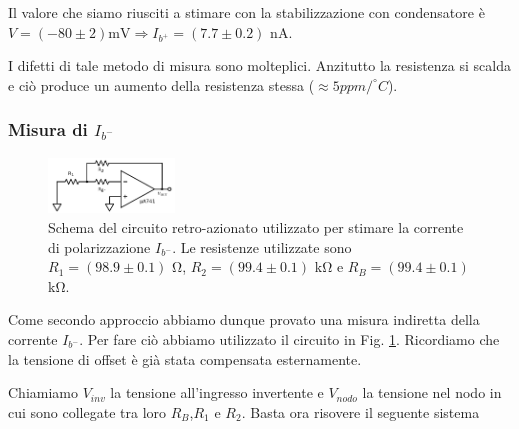 Il valore che siamo riusciti a stimare con la stabilizzazione con condensatore è $V=(-80 \pm 2) \si{\milli\volt} \Rightarrow I_{b^+}=(7.7 \pm 0.2)$ \si{\nano\ampere}.



I difetti di tale metodo di misura sono molteplici. Anzitutto la resistenza si scalda e ciò produce un aumento della resistenza stessa ($\approx 5 ppm/^{\circ}C$).





\subsubsection*{Misura di $I_{b^-}$}

\begin{figure}
  \begin{center}
    \includegraphics[width=0.30\textwidth]{../E02/latex/inv_current.pdf}
  \end{center}
  \caption{Schema del circuito retro-azionato utilizzato per stimare la corrente di polarizzazione $I_{b^-}$. Le resistenze utilizzate sono $R_1=(98.9\pm0.1)$ \si{\ohm}, $R_2=(99.4\pm0.1)$ \si{\kilo\ohm} e $R_B=(99.4\pm0.1)$ \si{\kilo\ohm}.}
  \label{circuito:rel2_correnti_retroazione_inv}
\end{figure}

Come secondo approccio abbiamo dunque provato una misura indiretta della corrente $I_{b^-}$. Per fare ciò abbiamo utilizzato il circuito in Fig. \ref{circuito:rel2_correnti_retroazione_inv}. Ricordiamo che la tensione di offset è già stata compensata esternamente.

Chiamiamo $V_{inv}$ la tensione all'ingresso invertente e $V_{nodo}$ la tensione nel nodo in cui sono collegate tra loro $R_B$,$R_1$ e $R_2$. Basta ora risovere il seguente sistema 


